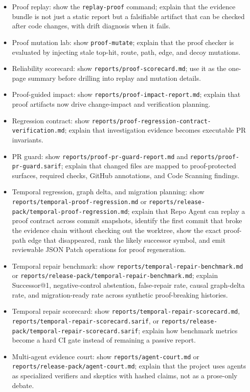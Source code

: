 \documentclass[UTF8,12pt,openany]{ctexbook}
\begin{document}
\begin{itemize}
\item Proof replay: show the \texttt{replay-proof} command; explain that the evidence bundle is not just a static report but a falsifiable artifact that can be checked after code changes, with drift diagnosis when it fails.
\item Proof mutation lab: show \texttt{proof-mutate}; explain that the proof checker is evaluated by injecting stale top-hit, route, path, edge, and decoy mutations.
\item Reliability scorecard: show \texttt{reports/proof-scorecard.md}; use it as the one-page summary before drilling into replay and mutation details.
\item Proof-guided impact: show \texttt{reports/proof-impact-report.md}; explain that proof artifacts now drive change-impact and verification planning.
\item Regression contract: show \texttt{reports/proof-regression-contract-verification.md}; explain that investigation evidence becomes executable PR invariants.
\item PR guard: show \texttt{reports/proof-pr-guard-report.md} and \texttt{reports/proof-pr-guard.sarif}; explain that changed files are mapped to proof-protected surfaces, required checks, GitHub annotations, and Code Scanning findings.
\item Temporal regression, graph delta, and migration planning: show \texttt{reports/temporal-proof-regression.md} or \texttt{reports/release-pack/temporal-proof-regression.md}; explain that Repo Agent can replay a proof contract across commit snapshots, identify the first commit that broke the evidence chain without checking out the worktree, show the exact proof-path edge that disappeared, rank the likely successor symbol, and emit reviewable JSON Patch operations for proof regeneration.
\item Temporal repair benchmark: show \texttt{reports/temporal-repair-benchmark.md} or \texttt{reports/release-pack/temporal-repair-benchmark.md}; explain Successor@1, negative-control abstention, false-repair rate, causal graph-delta rate, and migration-ready rate across synthetic proof-breaking histories.
\item Temporal repair scorecard: show \texttt{reports/temporal-repair-scorecard.md}, \texttt{reports/temporal-repair-scorecard.sarif}, or \texttt{reports/release-pack/temporal-repair-scorecard.sarif}; explain how benchmark metrics become a hard CI gate instead of remaining a passive report.
\item Multi-agent evidence court: show \texttt{reports/agent-court.md} or \texttt{reports/release-pack/agent-court.md}; explain that the project uses agents as specialized verifiers and skeptics with hashed claims, not as a prose-only debate.

\end{itemize}
\end{document}
